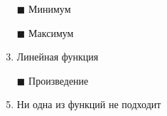 \begin{enumerate}[label=$\square$]
	
	
	
	\item[$\blacksquare$] Минимум
	\item[$\blacksquare$] Максимум
	\item Линейная функция
	\item[$\blacksquare$] Произведение
	\item Ни одна из функций не подходит
\end{enumerate}

